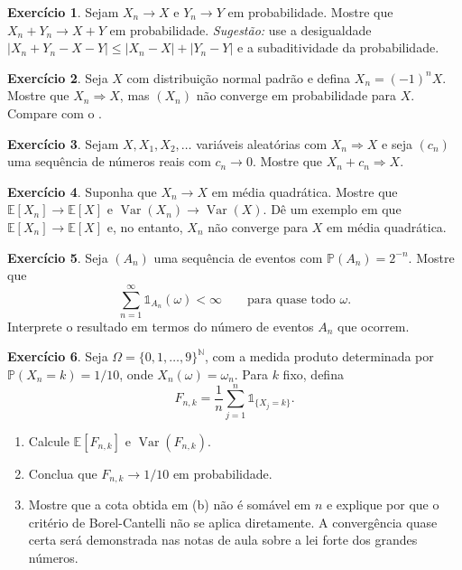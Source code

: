 \documentclass[12pt,portuguese]{article}
\theoremstyle{definition}
\theoremstyle{plainexercise}
\newtheorem{exercise}{Exercício}
\theoremstyle{starredexercise}
\theoremstyle{definition}
\begin{document}
\begin{exercise}\label{exercise:soma-prob}
Sejam $X_n\to X$ e $Y_n\to Y$ em probabilidade. Mostre que
$X_n+Y_n\to X+Y$ em probabilidade. \emph{Sugestão:} use a desigualdade
$|X_n+Y_n-X-Y|\leqslant|X_n-X|+|Y_n-Y|$ e a subaditividade da probabilidade.
\end{exercise}

\begin{exercise}\label{exercise:dist-ncg}
Seja $X$ com distribuição normal padrão e defina $X_n=(-1)^nX$. Mostre que
$X_n\Rightarrow X$, mas $(X_n)$ não converge em probabilidade para $X$.
Compare com o .
\end{exercise}

\begin{exercise}\label{exercise:deslocamento-dist}
Sejam $X,X_1,X_2,\ldots$ variáveis aleatórias com $X_n\Rightarrow X$ e seja
$(c_n)$ uma sequência de números reais com $c_n\to0$. Mostre que
$X_n+c_n\Rightarrow X$.
\end{exercise}

\begin{exercise}\label{exercise:media-variancia}
Suponha que $X_n\to X$ em média quadrática. Mostre que
$\mathbb{E}[X_n]\to\mathbb{E}[X]$ e
$\operatorname{Var}(X_n)\to\operatorname{Var}(X)$. Dê um exemplo em que
$\mathbb{E}[X_n]\to\mathbb{E}[X]$ e, no entanto, $X_n$ não converge para $X$ em
média quadrática.
\end{exercise}

\begin{exercise}\label{exercise:bc-somavel}
Seja $(A_n)$ uma sequência de eventos com $\mathbb{P}(A_n)=2^{-n}$. Mostre que
\[
\sum_{n=1}^{\infty}\mathds{1}_{A_n}(\omega)<\infty
\qquad\text{para quase todo }\omega.
\]
Interprete o resultado em termos do número de eventos $A_n$ que ocorrem.
\end{exercise}

\begin{exercise}\label{exercise:frequencia-digitos}
Seja $\Omega=\{0,1,\ldots,9\}^{\mathbb{N}}$, com a medida produto determinada
por $\mathbb{P}(X_n=k)=1/10$, onde $X_n(\omega)=\omega_n$. Para $k$ fixo,
defina
\[
F_{n,k}=\frac{1}{n}\sum_{j=1}^{n}\mathds{1}_{\{X_j=k\}}.
\]
\begin{enumerate}
\item[(a)] Calcule $\mathbb{E}[F_{n,k}]$ e $\operatorname{Var}(F_{n,k})$.
\item[(b)] Conclua que $F_{n,k}\to1/10$ em probabilidade.
\item[(c)] Mostre que a cota obtida em (b) não é somável em $n$ e explique por
que o critério de Borel-Cantelli não se aplica diretamente. A convergência
quase certa será demonstrada nas notas de aula sobre a lei forte dos grandes
números.
\end{enumerate}
\end{exercise}
\end{document}

